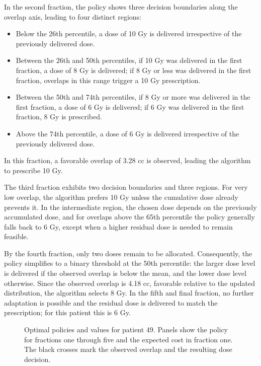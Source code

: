\documentclass[11pt]{article}
\begin{document}
In the second fraction, the policy shows three decision boundaries along the overlap axis, leading to four distinct regions:
\begin{itemize}
\item Below the 26th percentile, a dose of 10 Gy is delivered irrespective of the previously delivered dose.
\item Between the 26th and 50th percentiles, if 10 Gy was delivered in the first fraction, a dose of 8 Gy is delivered; if 8 Gy or less was delivered in the first fraction, overlaps in this range trigger a 10 Gy prescription.
\item Between the 50th and 74th percentiles, if 8 Gy or more was delivered in the first fraction, a dose of 6 Gy is delivered; if 6 Gy was delivered in the first fraction, 8 Gy is prescribed.
\item Above the 74th percentile, a dose of 6 Gy is delivered irrespective of the previously delivered dose.
\end{itemize}
In this fraction, a favorable overlap of 3.28 cc is observed, leading the algorithm to prescribe 10 Gy.

The third fraction exhibits two decision boundaries and three regions. For very low overlap, the algorithm prefers 10 Gy unless the cumulative dose already prevents it. In the intermediate region, the chosen dose depends on the previously accumulated dose, and for overlaps above the 65th percentile the policy generally falls back to 6 Gy, except when a higher residual dose is needed to remain feasible.

By the fourth fraction, only two doses remain to be allocated. Consequently, the policy simplifies to a binary threshold at the 50th percentile: the larger dose level is delivered if the observed overlap is below the mean, and the lower dose level otherwise. Since the observed overlap is 4.18 cc, favorable relative to the updated distribution, the algorithm selects 8 Gy. In the fifth and final fraction, no further adaptation is possible and the residual dose is delivered to match the prescription; for this patient this is 6 Gy.

\begin{figure}[ht]
\centering
{}
\caption{Optimal policies and values for patient 49. Panels show the policy for fractions one through five and the expected cost in fraction one. The black crosses mark the observed overlap and the resulting dose decision.}
\label{fig:patient49-policy}
\end{figure}
\end{document}
